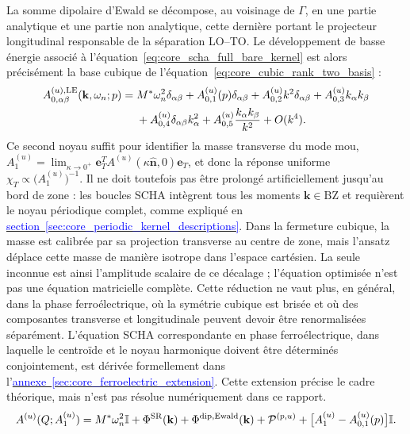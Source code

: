La somme dipolaire d'Ewald se décompose, au voisinage de $\Gamma$, en une
partie analytique et une partie non analytique, cette dernière portant le
projecteur longitudinal responsable de la séparation LO--TO. Le développement
de basse énergie associé à l'équation~\eqref{eq:core_scha_full_bare_kernel} est
alors précisément la base cubique de l'équation~\eqref{eq:core_cubic_rank_two_basis} :
\begin{equation}
\begin{aligned}
A^{(u),\rm LE}_{0,\alpha\beta}(\mathbf k,\omega_n;p)
={}&M^*\omega_n^2\delta_{\alpha\beta}
+A^{(u)}_{0,1}(p)\delta_{\alpha\beta}
+A^{(u)}_{0,2}k^2\delta_{\alpha\beta}
+A^{(u)}_{0,3}k_\alpha k_\beta\\
&+A^{(u)}_{0,4}\delta_{\alpha\beta}k_\alpha^2
+A^{(u)}_{0,5}\frac{k_\alpha k_\beta}{k^2}+O(k^4).
\end{aligned}
\label{eq:core_scha_low_energy_kernel}
\end{equation}
Ce second noyau suffit pour identifier la masse transverse du mode mou,
$A_1^{(u)}=\lim_{\kappa\to0^+}\mathbf e_T^T
A^{(u)}(\kappa\widehat{\mathbf n},0)\mathbf e_T$, et donc la réponse uniforme
$\chi_T\propto \big(A_1^{(u)}\big)^{-1}$. Il ne doit toutefois pas être prolongé
artificiellement jusqu'au bord de zone : les boucles SCHA intègrent tous les
moments $\mathbf k\in\mathrm{BZ}$ et requièrent le noyau périodique complet,
comme expliqué en
\hyperref[sec:core_periodic_kernel_descriptions]{\textcolor{blue}{section~\ref*{sec:core_periodic_kernel_descriptions}}}.
Dans la fermeture cubique, la masse est calibrée par sa projection transverse
au centre de zone, mais l'ansatz déplace cette masse de manière isotrope dans
l'espace cartésien. La seule inconnue est ainsi l'amplitude scalaire de ce
décalage ; l'équation optimisée n'est pas une équation matricielle complète.
Cette réduction ne vaut plus, en général, dans la phase ferroélectrique, où la
symétrie cubique est brisée et où des composantes transverse et longitudinale
peuvent devoir être renormalisées séparément.
L'équation SCHA correspondante en phase ferroélectrique, dans laquelle le
centroïde et le noyau harmonique doivent être déterminés conjointement, est
dérivée formellement dans
l'\hyperref[sec:core_ferroelectric_extension]{\textcolor{blue}{annexe~\ref*{sec:core_ferroelectric_extension}}}.
Cette extension précise le cadre théorique, mais n'est pas résolue
numériquement dans ce rapport.
\begin{equation}
A^{(u)}(Q;A_1^{(u)})=M^*\omega_n^2\mathbb I
+\Phi^{\rm SR}(\mathbf k)+\Phi^{\rm dip,Ewald}(\mathbf k)
+\mathcal P^{(p,u)}
+\big[A_1^{(u)}-A^{(u)}_{0,1}(p)\big]\mathbb I.
\label{eq:core_full_lattice_trial_kernel}
\end{equation}
